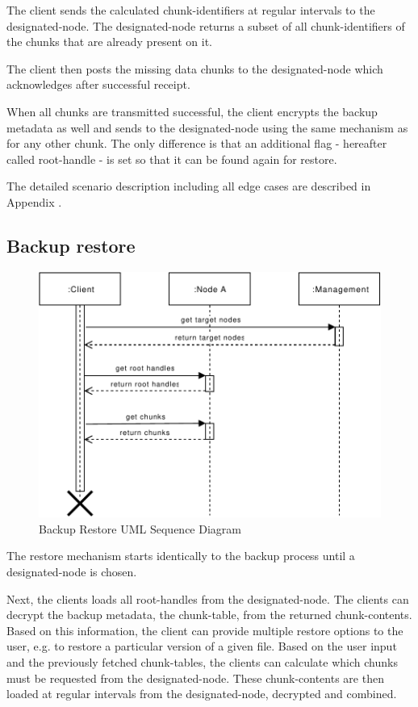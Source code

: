 The \gls{client} sends the calculated \glspl{chunk-identifier} at regular intervals to the \gls{designated-node}. The \gls{designated-node} returns a subset of all \glspl{chunk-identifier} of the \glspl{chunk} that are already present on it.

The \gls{client} then posts the missing data \glspl{chunk} to the \gls{designated-node} which acknowledges after successful receipt.

When all \glspl{chunk} are transmitted successful, the client encrypts the backup metadata as well and sends to the \gls{designated-node} using the same mechanism as for any other \gls{chunk}. The only difference is that an additional flag - hereafter called \gls{root-handle} - is set so that it can be found again for restore.

The detailed scenario description including all edge cases are described in Appendix .

\subsection{Backup restore}

\begin{figure}[h]
    \centering
    \includegraphics[width=\linewidth]{resources/backup_restore.pdf}
    \caption{Backup Restore UML Sequence Diagram}
\end{figure}

The restore mechanism starts identically to the backup process until a \gls{designated-node} is chosen.

Next, the \glspl{client} loads all \glspl{root-handle} from the \gls{designated-node}. The \glspl{client} can decrypt the backup metadata, the \gls{chunk-table}, from the returned \glspl{chunk-content}. Based on this information, the \gls{client} can provide multiple restore options to the \gls{user}, e.g. to restore a particular version of a given file.
Based on the user input and the previously fetched \glspl{chunk-table}, the \glspl{client} can calculate which \glspl{chunk} must be requested from the \gls{designated-node}. These \glspl{chunk-content} are then loaded at regular intervals from the \gls{designated-node}, decrypted and combined.

